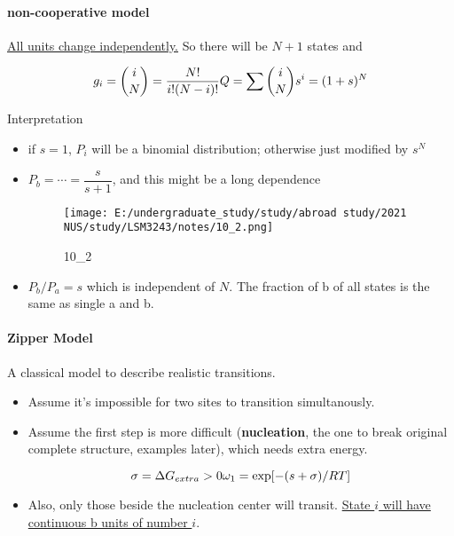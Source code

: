 \documentclass[]{article}
\let\oldparagraph\paragraph
\renewcommand{\paragraph}[1]{\oldparagraph{#1}\mbox{}}
\begin{document}
\hypertarget{non-cooperative-model}{%
\paragraph{non-cooperative model}\label{non-cooperative-model}}

\underline{All units change independently.} So there will be \(N+1\)
states and

\[g_i=\binom{i}{N}=\dfrac{N!}{i!(N-i)!}\\
Q=\sum \binom{i}{N}s^i=(1+s)^N\\\]

Interpretation

\begin{itemize}
\item
  if \(s=1\), \(P_i\) will be a binomial distribution; otherwise just
  modified by \(s^N\)
\item
  \(P_b=\cdots=\dfrac{s}{s+1}\), and this might be a long dependence

  \begin{figure}
  \centering
  \texttt{[image: E:/undergraduate\_study/study/abroad study/2021 NUS/study/LSM3243/notes/10\_2.png]}
  \caption{10\_2}
  \end{figure}
\item
  \(P_b/P_a=s\) which is independent of \(N\). The fraction of b of all
  states is the same as single a and b.
\end{itemize}

\hypertarget{zipper-model}{%
\paragraph{Zipper Model}\label{zipper-model}}

A classical model to describe realistic transitions.

\begin{itemize}
\item
  Assume it's impossible for two sites to transition simultanously.
\item
  Assume the first step is more difficult (\textbf{nucleation}, the one
  to break original complete structure, examples later), which needs
  extra energy.

  \[\sigma=\Delta G_{extra}>0\\
  \omega_1=\exp[-(s+\sigma)/RT]\]
\item
  Also, only those beside the nucleation center will transit.
  \underline{State \(i\) will have continuous b units of number \(i\)}. 
\end{itemize}
\end{document}
